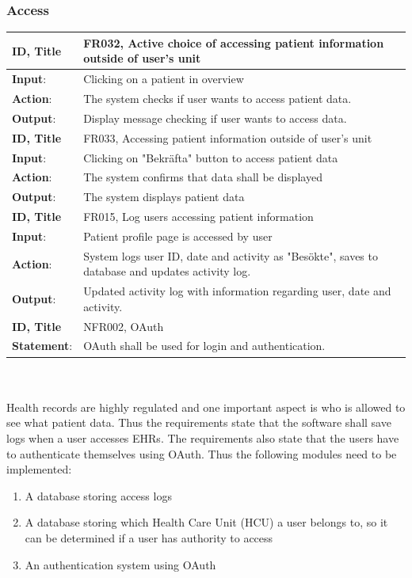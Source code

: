 \documentclass{article}
\begin{document}
\subsubsection{Access}
\begin{tabularx}{\linewidth}{| l |  X |}
\hline
\textbf{ID, Title} & FR032, Active choice of accessing patient information outside of user's unit \\ 
\hline
\textbf{Input}: & Clicking on a patient in overview \\
\textbf{Action}: & The system checks if user wants to access patient data. \\
\textbf{Output}: & Display message checking if user wants to access data. \\
\hline

\textbf{ID, Title} & FR033, Accessing patient information outside of user's unit \\ 
\hline
\textbf{Input}: & Clicking on "Bekräfta" button to access patient data \\
\textbf{Action}: & The system confirms that data shall be displayed \\
\textbf{Output}: & The system displays patient data \\
\hline

\textbf{ID, Title} & FR015, Log users accessing patient information \\ 
\hline
\textbf{Input}: & Patient profile page is accessed by user \\ 
\textbf{Action}: & System logs user ID, date and activity as "Besökte", saves to database and updates activity log. \\ 
\textbf{Output}: & Updated activity log with information regarding user, date and activity. \\
\hline

\textbf{ID, Title} & NFR002, OAuth \\ 
\hline
\textbf{Statement}: & OAuth shall be used for login and authentication.\\
\hline
\end{tabularx}
\\ \\
Health records are highly regulated and one important aspect is who is allowed to see what patient data. Thus the requirements state that the software shall save logs when a user accesses EHRs. The requirements also state that the users have to authenticate themselves using OAuth. 
Thus the following modules need to be implemented:

\begin{enumerate}[label=(\roman*)]
\item A database storing access logs
\item A database storing which Health Care Unit (HCU) a user belongs to, so it can be determined if a user has authority to access
\item An authentication system using OAuth
\end{enumerate}
\end{document}
